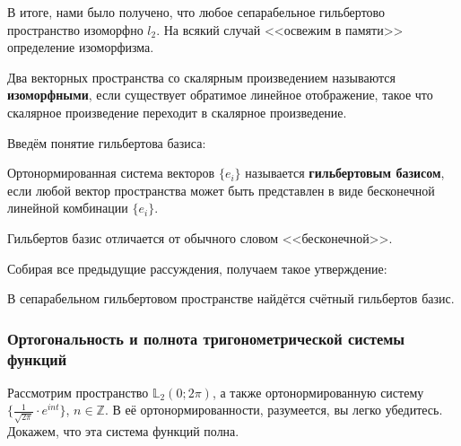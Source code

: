 \documentclass[12pt]{article}
\begin{document}
	
			В итоге, нами было получено, что любое сепарабельное гильбертово пространство изоморфно $l_2$.
			На всякий случай <<освежим в памяти>> определение изоморфизма.
	
			\begin{defi}
				Два векторных пространства со скалярным произведением называются 
				\textbf{изоморфными}, если существует обратимое линейное отображение, 
				такое что скалярное произведение переходит в скалярное произведение.
			\end{defi}
	
			Введём понятие гильбертова базиса:
			\begin{defi}
				Ортонормированная система векторов $\{ e_i \}$ называется \textbf{гильбертовым базисом}, если
				любой вектор
				пространства может быть представлен в виде бесконечной линейной комбинации $ \{ e_i \} $.
			\end{defi}
	
			{\color{gray} Гильбертов базис отличается от обычного словом <<бесконечной>>.}

			Собирая все предыдущие рассуждения, получаем такое утверждение:

			\begin{state}
				В сепарабельном гильбертовом пространстве найдётся счётный гильбертов базис.
			\end{state}

		\subsubsection{Ортогональность и полнота тригонометрической системы функций}


			Рассмотрим пространство $\mathbb{L}_2 (0; 2\pi)$, а также ортонормированную систему $\{ \frac{1}{\sqrt{2\pi}} \cdot e^{int} \}$, $n \in \mathbb{Z}$. {\color{gray} В её ортонормированности, разумеется, вы легко убедитесь.} Докажем, что эта система функций полна.
\end{document}
